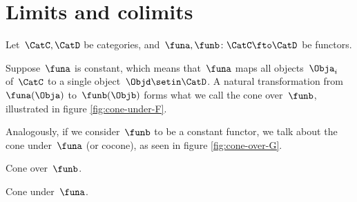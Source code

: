 

\section{Limits and colimits}


    Let~$\CatC, \CatD$ be categories, and~$\funa, \funb\colon\CatC\fto\CatD$ be functors. 
    
    Suppose~$\funa$ is constant, which means that~$\funa$ maps all objects~$\Obja_i$ of~$\CatC$ to a single object~$\Objd \setin \CatD$.
    A natural transformation from~$\funa(\Obja)$ to~$\funb(\Objb)$ forms what we call the cone over~$\funb$, illustrated in figure \cref{fig:cone-under-F}.
    
    Analogously, if we consider~$\funb$ to be a constant functor, we talk about the cone under~$\funa$ (or cocone), as seen in figure \cref{fig:cone-over-G}.



\begin{marginfigure}
    \centering
    \caption{Cone over~$\funb$.
    }
    \label{fig:cone-over-G}
\end{marginfigure}

\begin{marginfigure}
    \centering
    \label{fig:cone-under-F}
    \caption{Cone under~$\funa$.}
\end{marginfigure}


